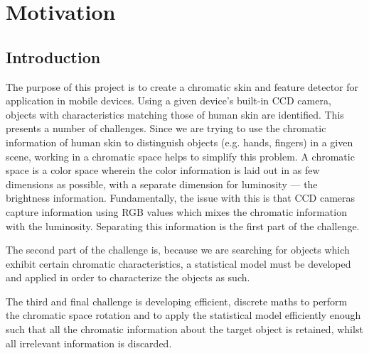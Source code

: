 
\chapter{Motivation}  %

\ifpdf
    \graphicspath{{Chapter1/Figs/Raster/}{Chapter1/Figs/PDF/}{Chapter1/Figs/}}
\else
    \graphicspath{{Chapter1/Figs/Vector/}{Chapter1/Figs/}}
\fi

\section{Introduction}\label{sec:Introduction}

The purpose of this project is to create a chromatic skin and feature detector for application in mobile devices. Using a given device's built-in CCD camera, objects with characteristics matching those of human skin are identified. This presents a number of challenges. Since we are trying to use the chromatic information of human skin to distinguish objects (e.g. hands, fingers) in a given scene, working in a chromatic space helps to simplify this problem. A chromatic space is a color space wherein the color information is laid out in as few dimensions as possible, with a separate dimension for luminosity --- the brightness information. Fundamentally, the issue with this is that CCD cameras capture information using RGB values which mixes the chromatic information with the luminosity. Separating this information is the first part of the challenge.

The second part of the challenge is, because we are searching for objects which exhibit certain chromatic characteristics, a statistical model must be developed and applied in order to characterize the objects as such.

The third and final challenge is developing efficient, discrete maths to perform the chromatic space rotation and to apply the statistical model efficiently enough such that all the chromatic information about the target object is retained, whilst all irrelevant information is discarded.

